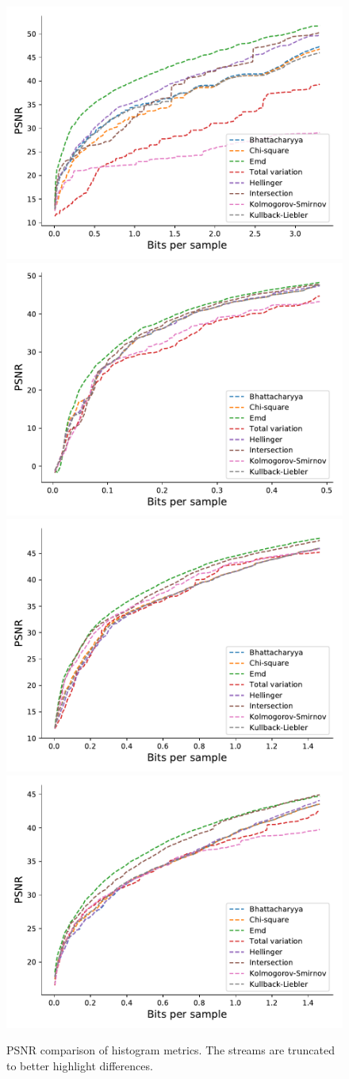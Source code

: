 \begin{figure}
	\centering
	{\includegraphics[width=0.48\linewidth]{img/histogram/different-metrics/boiler-histogram-metrics.pdf}}
	{\includegraphics[width=0.48\linewidth]{img/histogram/different-metrics/kflame-histogram-metrics.pdf}}
	{\includegraphics[width=0.48\linewidth]{img/histogram/different-metrics/miranda-diffusivity-histogram-metrics.pdf}}
	{\includegraphics[width=0.48\linewidth]{img/histogram/different-metrics/turbulence-histogram-metrics.pdf}}
	\caption{PSNR comparison of histogram metrics. The streams are truncated to better highlight differences.}
	\label{fig:histogram-metrics-comparison}
\end{figure}

